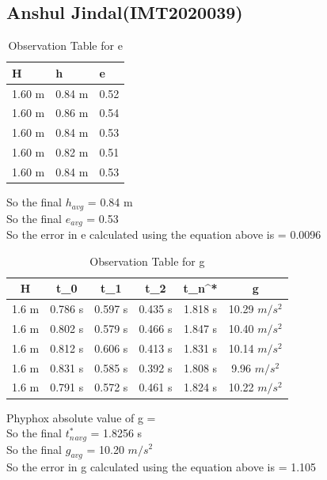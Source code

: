 \documentclass[11pt]{scrartcl} %
\begin{document}
\newpage
\subsection{Anshul Jindal(IMT2020039)}

\begin{table}[h] %
	\centering %
	\begin{tabular}{l l l}
		\toprule
		\textbf{H} & \textbf{h} & \textbf{e} \\
		\midrule
		1.60 m & 0.84 m & 0.52\\
        1.60 m & 0.86 m & 0.54\\
        1.60 m & 0.84 m & 0.53\\
        1.60 m & 0.82 m & 0.51 \\
        1.60 m & 0.84 m & 0.53 \\
		\bottomrule
	\end{tabular}
	\caption{Observation Table for e}
\end{table}
So the final $h_{avg}$ = 0.84 m\\
So the final $e_{avg}$ = 0.53\\
So the error in e calculated using the equation above is  = 0.0096 

\begin{table}[h]
\centering
\begin{tabular}{||c c c c c c||} 
\toprule
 \hline
 H & t_0 & t_1 & t_2 & t_n^* & g \\ [0.5ex] 
 \midrule
 \hline\hline
 1.6 m & 0.786 s & 0.597 s  & 0.435 s & 1.818 s & 10.29 $m/s^2$ \\
 \hline
 1.6 m & 0.802 s & 0.579 s & 0.466 s & 1.847 s & 10.40 $m/s^2$  \\
 \hline
 1.6 m & 0.812 s & 0.606 s & 0.413 s & 1.831 s  & 10.14 $m/s^2$ \\
 \hline
 1.6 m & 0.831 s & 0.585 s & 0.392 s & 1.808 s  & 9.96 $m/s^2$  \\
 \hline
 1.6 m & 0.791 s & 0.572 s & 0.461 s & 1.824 s  & 10.22 $m/s^2$ \\ [1ex]
 \bottomrule
 \hline
\end{tabular}
\caption{Observation Table for g}
\end{table}
Phyphox absolute value of g =\\
So the final $t_n^*_{avg}$ = 1.8256 s\\
So the final $g_{avg}$ = 10.20 $m/s^2$\\
So the error in g calculated using the equation above is  = 1.105 \\
\end{document}
